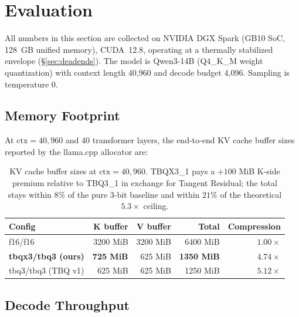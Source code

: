 \documentclass[10pt,twocolumn]{article}
\begin{document}
\section{Evaluation}
\label{sec:eval}

All numbers in this section are collected on NVIDIA DGX Spark (GB10 SoC, 128~GB unified memory), CUDA~12.8, operating at a thermally stabilized envelope (\S\ref{sec:deadends}). The model is Qwen3-14B (Q4\_K\_M weight quantization) with context length 40,960 and decode budget 4,096. Sampling is temperature $0$.

\subsection{Memory Footprint}

At $\text{ctx}=40{,}960$ and 40 transformer layers, the end-to-end KV cache buffer sizes reported by the llama.cpp allocator are:

\begin{table}[t]
\centering
\small
\begin{tabular}{@{}lrrrr@{}}
\toprule
\textbf{Config} & \textbf{K buffer} & \textbf{V buffer} & \textbf{Total} & \textbf{Compression} \\
\midrule
f16/f16                     & 3200 MiB & 3200 MiB & 6400 MiB & $1.00\times$ \\
\textbf{tbqx3/tbq3 (ours)}  & \textbf{725 MiB} & 625 MiB & \textbf{1350 MiB} & \textbf{$4.74\times$} \\
tbq3/tbq3 (TBQ v1)          & 625 MiB & 625 MiB & 1250 MiB & $5.12\times$ \\
\bottomrule
\end{tabular}
\caption{KV cache buffer sizes at $\text{ctx}=40{,}960$. TBQX3\_1 pays a $+100$ MiB K-side premium relative to TBQ3\_1 in exchange for Tangent Residual; the total stays within $8\%$ of the pure 3-bit baseline and within $21\%$ of the theoretical $5.3\times$ ceiling.}
\label{tab:memory}
\end{table}

\subsection{Decode Throughput}
\end{document}
